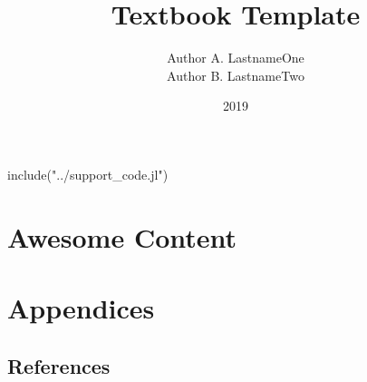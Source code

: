 \documentclass[fullbook]{tufte_algorithms_book}
\title{Textbook Template}
\author[LastnameOne and LastnameTwo]{Author A. LastnameOne \\ Author B. LastnameTwo}
\date{2019}
\begin{document}
\frontmatter



\tableofcontents


\mainmatter
\begin{jlcode}
	include("../support_code.jl")
\end{jlcode}

\part{Awesome Content} %


\appendix
\part*{Appendices}
{}%


\solutions
\backmatter
\chapter*{References}
\printbibliography[heading=none]

\printindex
\end{document}
